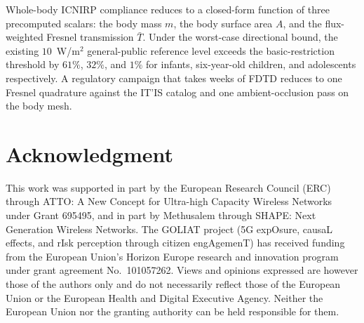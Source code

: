 \documentclass[journal,twocolumn,10pt]{IEEEtran}
\theoremstyle{plain}
\theoremstyle{remark}
\newcommand{\Tbar}{\bar{T}}
\begin{document}
Whole-body ICNIRP compliance reduces to a closed-form function of
three precomputed scalars: the body mass $m$, the body surface area
$A$, and the flux-weighted Fresnel transmission $\Tbar$. Under the
worst-case directional bound, the existing $10$~W/m$^2$
general-public reference level exceeds the basic-restriction
threshold by $61\%$, $32\%$, and $1\%$ for infants, six-year-old
children, and adolescents respectively. A regulatory campaign that
takes weeks of FDTD reduces to one Fresnel quadrature against the
IT'IS catalog and one ambient-occlusion pass on the body mesh.


\section*{Acknowledgment}
This work was supported in part by the European Research Council
(ERC) through ATTO: A New Concept for Ultra-high Capacity Wireless
Networks under Grant 695495, and in part by Methusalem through
SHAPE: Next Generation Wireless Networks. The GOLIAT project (5G
expOsure, causaL effects, and rIsk perception through citizen
engAgemenT) has received funding from the European Union's Horizon
Europe research and innovation program under grant agreement
No.~101057262. Views and opinions expressed are however those of
the authors only and do not necessarily reflect those of the
European Union or the European Health and Digital Executive Agency.
Neither the European Union nor the granting authority can be held
responsible for them.
\end{document}
